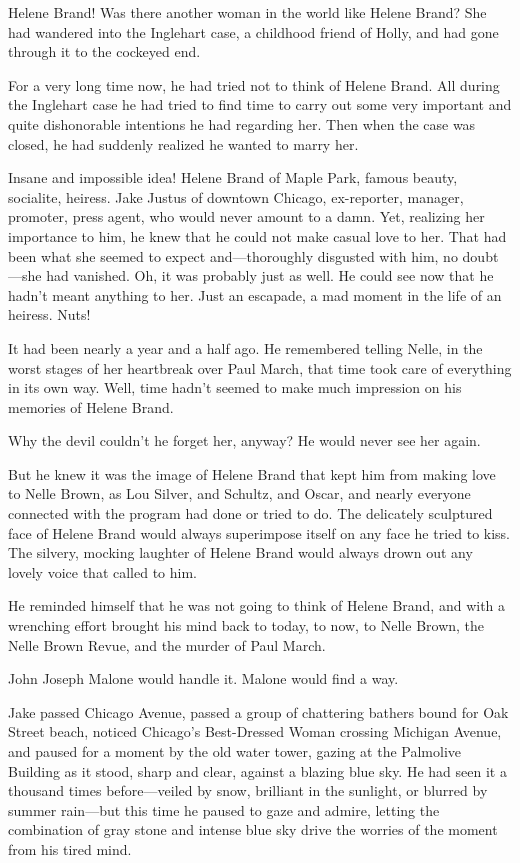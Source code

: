 \documentclass{novel}
\begin{document}
Helene Brand! Was there another woman in the world like Helene Brand? She had wandered into the Inglehart case, a childhood friend of Holly, and had gone through it to the cockeyed end.

For a very long time now, he had tried not to think of Helene Brand. All during the Inglehart case he had tried to find time to carry out some very important and quite dishonorable intentions he had regarding her. Then when the case was closed, he had suddenly realized he wanted to marry her.

Insane and impossible idea! Helene Brand of Maple Park, famous beauty, socialite, heiress. Jake Justus of downtown Chicago, ex-reporter, manager, promoter, press agent, who would never amount to a damn. Yet, realizing her importance to him, he knew that he could not make casual love to her. That had been what she seemed to expect and—thoroughly disgusted with him, no doubt—she had vanished. Oh, it was probably just as well. He could see now that he hadn’t meant anything to her. Just an escapade, a mad moment in the life of an heiress. Nuts!

It had been nearly a year and a half ago. He remembered telling Nelle, in the worst stages of her heartbreak over Paul March, that time took care of everything in its own way. Well, time hadn’t seemed to make much impression on his memories of Helene Brand.

Why the devil couldn’t he forget her, anyway? He would never see her again.

But he knew it was the image of Helene Brand that kept him from making love to Nelle Brown, as Lou Silver, and Schultz, and Oscar, and nearly everyone connected with the program had done or tried to do. The delicately sculptured face of Helene Brand would always superimpose itself on any face he tried to kiss. The silvery, mocking laughter of Helene Brand would always drown out any lovely voice that called to him.

He reminded himself that he was not going to think of Helene Brand, and with a wrenching effort brought his mind back to today, to now, to Nelle Brown, the Nelle Brown Revue, and the murder of Paul March.

John Joseph Malone would handle it. Malone would find a way.

Jake passed Chicago Avenue, passed a group of chattering bathers bound for Oak Street beach, noticed Chicago’s Best-Dressed Woman crossing Michigan Avenue, and paused for a moment by the old water tower, gazing at the Palmolive Building as it stood, sharp and clear, against a blazing blue sky. He had seen it a thousand times before—veiled by snow, brilliant in the sunlight, or blurred by summer rain—but this time he paused to gaze and admire, letting the combination of gray stone and intense blue sky drive the worries of the moment from his tired mind.
\end{document}
